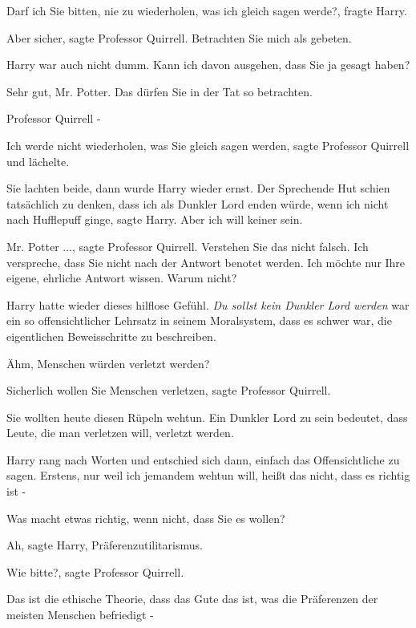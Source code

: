 \glqq{}Darf ich Sie bitten, nie zu wiederholen, was ich gleich sagen
werde?\grqq{}, fragte Harry.

\glqq{}Aber sicher\grqq{}, sagte Professor Quirrell. \glqq{}Betrachten Sie mich
als gebeten.\grqq{}

Harry war auch nicht dumm. \glqq{}Kann ich davon ausgehen, dass Sie ja gesagt
haben?\grqq{}

\glqq{}Sehr gut, Mr. Potter. Das dürfen Sie in der Tat so betrachten.\grqq{}

\glqq{}Professor Quirrell -\grqq{}

\glqq{}Ich werde nicht wiederholen, was Sie gleich sagen werden\grqq{}, sagte
Professor Quirrell und lächelte.

Sie lachten beide, dann wurde Harry wieder ernst. \glqq{}Der Sprechende Hut
schien tatsächlich zu denken, dass ich als Dunkler Lord enden würde, wenn ich
nicht nach Hufflepuff ginge\grqq{}, sagte Harry. \glqq{}Aber ich will keiner
sein.\grqq{}

\glqq{}Mr. Potter ...\grqq{}, sagte Professor Quirrell. \glqq{}Verstehen Sie das
nicht falsch. Ich verspreche, dass Sie nicht nach der Antwort benotet werden.
Ich möchte nur Ihre eigene, ehrliche Antwort wissen. Warum nicht?\grqq{}

Harry hatte wieder dieses hilflose Gefühl. \emph{Du sollst kein Dunkler Lord
werden} war ein so offensichtlicher Lehrsatz in seinem Moralsystem, dass es
schwer war, die eigentlichen Beweisschritte zu beschreiben.

\glqq{}Ähm, Menschen würden verletzt werden?\grqq{}

\glqq{}Sicherlich wollen Sie Menschen verletzen\grqq{}, sagte Professor Quirrell.

\glqq{}Sie wollten heute diesen Rüpeln wehtun. Ein Dunkler Lord zu sein bedeutet,
dass Leute, die man verletzen will, verletzt werden.\grqq{}

Harry rang nach Worten und entschied sich dann, einfach das Offensichtliche zu
sagen. \glqq{}Erstens, nur weil ich jemandem wehtun will, heißt das nicht, dass
es richtig ist -\grqq{}

\glqq{}Was macht etwas richtig, wenn nicht, dass Sie es wollen?\grqq{}

\glqq{}Ah\grqq{}, sagte Harry, \glqq{}Präferenzutilitarismus.\grqq{}

\glqq{}Wie bitte?\grqq{}, sagte Professor Quirrell.

\glqq{}Das ist die ethische Theorie, dass das Gute das ist, was die Präferenzen
der meisten Menschen befriedigt -\grqq{}

